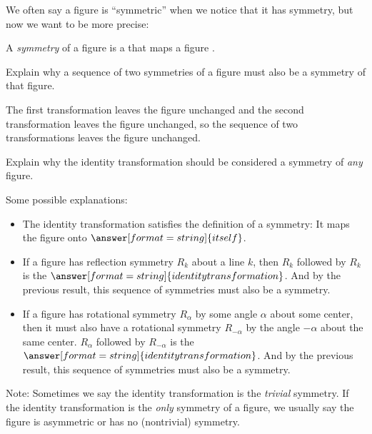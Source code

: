 \documentclass[nooutcomes]{ximera}
\begin{document}
\begin{question}
We often say a figure is ``symmetric'' when we notice that it has symmetry, but now we want to be more precise:  

A \emph{symmetry} of a figure is a
that maps a figure 
.  
\end{question}

\begin{question}
Explain why a sequence of two symmetries of a figure must also be a symmetry of that figure.  
\begin{freeResponse}
\begin{hint}
The first transformation leaves the figure unchanged and the second transformation leaves the figure unchanged, so the sequence of two transformations leaves the figure unchanged.  
\end{hint}
\end{freeResponse}
\end{question}

\begin{question}
Explain why the identity transformation should be considered a symmetry of \emph{any} figure.   

\begin{freeResponse}
\begin{hint}
Some possible explanations: 
\begin{itemize}
\item The identity transformation satisfies the definition of a symmetry: It maps the figure onto $\answer[format=string]{itself}$. 
\item If a figure has reflection symmetry $R_k$ about a line $k$, then $R_k$ followed by $R_k$ is the $\answer[format=string]{identity transformation}$.  And by the previous result, this sequence of symmetries must also be a symmetry.  
\item If a figure has rotational symmetry $R_\alpha$ by some angle $\alpha$ about some center, then it must also have a rotational symmetry $R_{-\alpha}$ by the angle $-\alpha$ about the same center.  $R_\alpha$ followed by $R_{-\alpha}$ is the $\answer[format=string]{identity transformation}$.  And by the previous result, this sequence of symmetries must also be a symmetry.  
\end{itemize}
\end{hint}
\end{freeResponse}
\begin{feedback}
Note: Sometimes we say the identity transformation is the \emph{trivial} symmetry.  If the identity transformation is the \emph{only} symmetry of a figure, we usually say the figure is asymmetric or has no (nontrivial) symmetry.  
\end{feedback}
\end{question}
\end{document}
